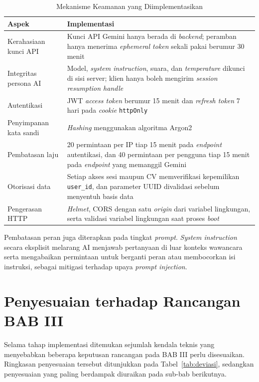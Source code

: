 \documentclass[12pt,a4paper,oneside]{report}
\begin{document}
\begin{table}[H]
\caption{Mekanisme Keamanan yang Diimplementasikan}
\label{tab:keamanan}
\centering
\begin{tabularx}{\textwidth}{|L{4.4cm}|X|}
\hline
\textbf{Aspek} & \textbf{Implementasi} \\
\hline
Kerahasiaan kunci API & Kunci API Gemini hanya berada di \textit{backend}; peramban hanya menerima \textit{ephemeral token} sekali pakai berumur 30 menit \\
\hline
Integritas persona AI & Model, \textit{system instruction}, suara, dan \textit{temperature} dikunci di sisi server; klien hanya boleh mengirim \textit{session resumption handle} \\
\hline
Autentikasi & JWT \textit{access token} berumur 15 menit dan \textit{refresh token} 7 hari pada \textit{cookie} \texttt{httpOnly} \\
\hline
Penyimpanan kata sandi & \textit{Hashing} menggunakan algoritma Argon2 \\
\hline
Pembatasan laju & 20 permintaan per IP tiap 15 menit pada \textit{endpoint} autentikasi, dan 40 permintaan per pengguna tiap 15 menit pada \textit{endpoint} yang memanggil Gemini \\
\hline
Otorisasi data & Setiap akses sesi maupun CV memverifikasi kepemilikan \texttt{user\_id}, dan parameter UUID divalidasi sebelum menyentuh basis data \\
\hline
Pengerasan HTTP & \textit{Helmet}, CORS dengan satu \textit{origin} dari variabel lingkungan, serta validasi variabel lingkungan saat proses \textit{boot} \\
\hline
\end{tabularx}
\end{table}

Pembatasan peran juga diterapkan pada tingkat \textit{prompt}. \textit{System
instruction} secara eksplisit melarang AI menjawab pertanyaan di luar konteks
wawancara serta mengabaikan permintaan untuk berganti peran atau membocorkan
isi instruksi, sebagai mitigasi terhadap upaya \textit{prompt injection}.

\section{Penyesuaian terhadap Rancangan BAB III}

Selama tahap implementasi ditemukan sejumlah kendala teknis yang menyebabkan
beberapa keputusan rancangan pada BAB III perlu disesuaikan. Ringkasan
penyesuaian tersebut ditunjukkan pada Tabel~\ref{tab:deviasi}, sedangkan
penyesuaian yang paling berdampak diuraikan pada sub-bab berikutnya.
\end{document}
